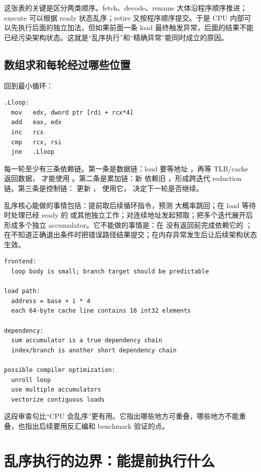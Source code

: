 这张表的关键是区分两类顺序。fetch、decode、rename 大体沿程序顺序推进；execute 可以根据 ready 状态乱序；retire 又按程序顺序提交。于是 CPU 内部可以先执行后面的独立加法，但如果前面一条 load 最终触发异常，后面的结果不能已经污染架构状态。这就是“乱序执行”和“精确异常”能同时成立的原因。

\subsection{数组求和每轮经过哪些位置}
回到最小循环：

\begin{lstlisting}[numbers=none,caption={数组求和的一种机器形状}]
.Lloop:
  mov   edx, dword ptr [rdi + rcx*4]
  add   eax, edx
  inc   rcx
  cmp   rcx, rsi
  jne   .Lloop
\end{lstlisting}

每一轮至少有三条依赖链。第一条是数据链：load 要等地址 ，再等 TLB/cache 返回数据， 才能使用 。第二条是累加链：新  依赖旧 ，形成跨迭代 reduction 链。第三条是控制链： 更新 ， 使用它， 决定下一轮是否继续。

乱序核心能做的事情包括：提前取后续循环指令，预测  大概率跳回；在 load 等待时处理已经 ready 的  或其他独立工作；对连续地址发起预取；把多个迭代展开后形成多个独立 accumulator。它不能做的事情是：在  没有返回前完成依赖它的 ；在不知道正确退出条件时把错误路径结果提交；在内存异常发生后让后续架构状态生效。

\begin{lstlisting}[numbers=none,caption={求和循环的性能审查句}]
frontend:
  loop body is small; branch target should be predictable

load path:
  address = base + i * 4
  each 64-byte cache line contains 16 int32 elements

dependency:
  sum accumulator is a true dependency chain
  index/branch is another short dependency chain

possible compiler optimization:
  unroll loop
  use multiple accumulators
  vectorize contiguous loads
\end{lstlisting}

这段审查句比“CPU 会乱序”更有用。它指出哪些地方可重叠，哪些地方不能重叠，也指出后续要用反汇编和 benchmark 验证的点。

\section{乱序执行的边界：能提前执行什么}

